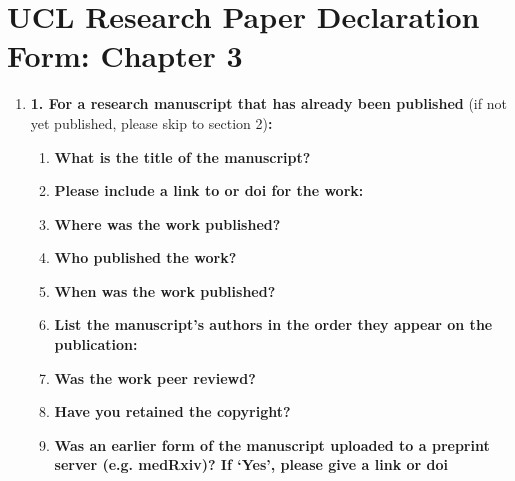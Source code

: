 
\newpage	
\section*{UCL Research Paper Declaration Form: Chapter 3}

    \begin{enumerate}\itemsep0em
    
        \item \textbf{1.	For a research manuscript that has already been published} (if not yet published, please skip to section 2)\textbf{:}
        \begin{enumerate}\itemsep0em
            \item \textbf{What is the title of the manuscript?}
            \item \textbf{Please include a link to or doi for the work:}
            \item \textbf{Where was the work published?}
            \item \textbf{Who published the work?}
            \item \textbf{When was the work published?}
            \item \textbf{List the manuscript's authors in the order they appear on the publication:}
            \item \textbf{Was the work peer reviewd?}
            \item \textbf{Have you retained the copyright?}
            \item \textbf{Was an earlier form of the manuscript uploaded to a preprint server (e.g. medRxiv)? If ‘Yes’, please give a link or doi} 

\end{enumerate}
\end{enumerate}
